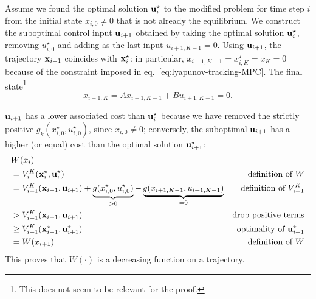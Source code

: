 Assume we found the optimal solution $\boldsymbol{\mathrm{u}}_i^\star$ to the modified problem for time step $i$ from the initial state $x_{i,0}\neq 0$ that is not already the equilibrium. We construct the suboptimal control input $\boldsymbol{\mathrm{u}}_{i+1}$ obtained by taking the optimal solution $\boldsymbol{\mathrm{u}}_i^\star$, removing $u_{i,0}^\star$ and adding as the last input $u_{i+1,K-1} = 0$. Using $\boldsymbol{\mathrm{u}}_{i+1}$, the trajectory $\boldsymbol{\mathrm{x}}_{i+1}$ coincides with $\boldsymbol{\mathrm{x}}_i^\star$: in particular, $x_{i+1,K-1}=x_{i,K}^\star=x_K=0$ because of the constraint imposed in eq.~\eqref{eq:lyapunov-tracking-MPC}. The final state\footnote{This does not seem to be relevant for the proof.}
\begin{equation*}
  x_{i+1,K} = Ax_{i+1,K-1}+Bu_{i+1,K-1} = 0.
\end{equation*}

$\boldsymbol{\mathrm{u}}_{i+1}$ has a lower associated cost than $\boldsymbol{\mathrm{u}}_i^\star$ because we have removed the strictly positive $g_k(x_{i,0}^\star,u_{i,0}^\star)$, since $x_{i,0}\neq 0$; conversely, the suboptimal $\boldsymbol{\mathrm{u}}_{i+1}$ has a higher (or equal) cost than the optimal solution $\boldsymbol{\mathrm{u}}_{i+1}^\star$:
\begin{align*}
  & W(x_i) \\
  & = V_i^K(\boldsymbol{\mathrm{x}}_i^\star, \boldsymbol{\mathrm{u}}_i^\star) & \text{definition of $W$} \\
  & = V_{i+1}^K(\boldsymbol{\mathrm{x}}_{i+1}, \boldsymbol{\mathrm{u}}_{i+1}) + \underbrace{g(x_{i,0}^\star,u_{i,0}^\star)}_{>0} - \underbrace{g(x_{i+1,K-1},u_{i+1,K-1})}_{=0} & \text{definition of $V_{i+1}^K$} \\
  & > V_{i+1}^K(\boldsymbol{\mathrm{x}}_{i+1}, \boldsymbol{\mathrm{u}}_{i+1}) & \text{drop positive terms} \\
  & \geq V_{i+1}^K(\boldsymbol{\mathrm{x}}_{i+1}^\star, \boldsymbol{\mathrm{u}}_{i+1}^\star) & \text{optimality of $\boldsymbol{\mathrm{u}}_{i+1}^\star$} \\
  & = W(x_{i+1}) & \text{definition of $W$}
\end{align*}
This proves that $W(\cdot)$ is a decreasing function on a trajectory.



